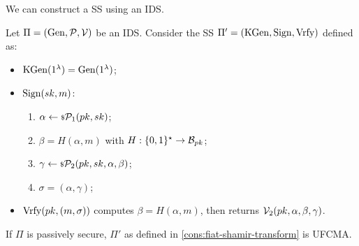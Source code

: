 We can construct a \ac{SS} using an \ac{IDS}.
\begin{construction} \label{cons:fiat-shamir-transform}
	Let $\Pi = (\mathrm{Gen}, \mathcal{P}, \mathcal{V})$ be an \ac{IDS}.
	Consider the \ac{SS} $\Pi' = (\mathrm{KGen}, \mathrm{Sign}, \mathrm{Vrfy})$ defined as:
	\begin{itemize}
		\item $\mathrm{KGen}(1^{\lambda}) = \mathrm{Gen}(1^{\lambda})$;
		\item $\mathrm{Sign}(sk, m)$:
			\begin{enumerate}
				\item $\alpha \leftarrow {\scriptstyle \$} {\mathcal{P}_1(pk, sk)}$;
				\item $\beta = H(\alpha, m)$ with $H : \{0,1\}^{\star} \to \mathcal{B}_{pk}$;
				\item $\gamma \leftarrow {\scriptstyle \$} {\mathcal{P}_2(pk, sk, \alpha, \beta)}$;
				\item $\sigma = (\alpha, \gamma)$;
			\end{enumerate}
		\item $\mathrm{Vrfy}(pk, (m, \sigma))$ computes $\beta = H(\alpha, m)$, then returns $\mathcal{V}_2(pk, \alpha, \beta, \gamma)$.
	\end{itemize}
\end{construction}

\begin{theorem} \label{thm:fiat-shamir-transform}
	If $\Pi$ is passively secure, $\Pi'$ as defined in \cref{cons:fiat-shamir-transform} is \ac{UFCMA}.
\end{theorem}

